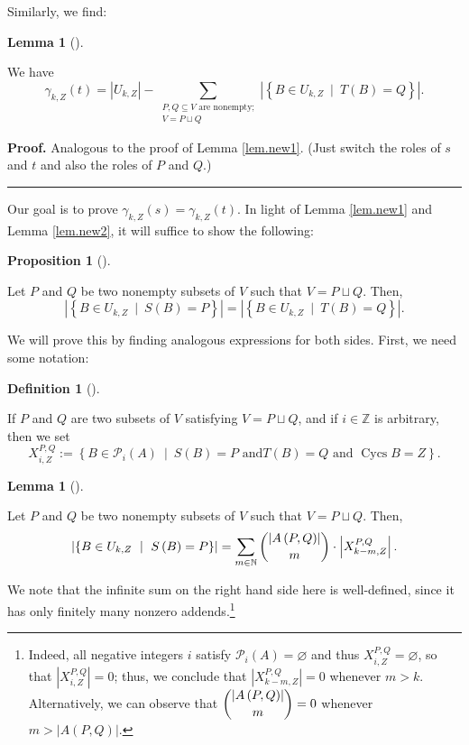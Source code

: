 \documentclass[numbers=enddot,12pt,final,onecolumn,notitlepage]{scrartcl}%
\theoremstyle{definition}
\newtheorem{lem}[theo]{Lemma}
\newenvironment{lemma}[1][]
{\begin{lem}[#1]\begin{leftbar}}
{\end{leftbar}\end{lem}}
\newtheorem{prop}[theo]{Proposition}
\newenvironment{proposition}[1][]
{\begin{prop}[#1]\begin{leftbar}}
{\end{leftbar}\end{prop}}
\newtheorem{defi}[theo]{Definition}
\newenvironment{definition}[1][]
{\begin{defi}[#1]\begin{leftbar}}
{\end{leftbar}\end{defi}}
\newenvironment{proof}[1][Proof]{\noindent\textbf{#1.} }{\ \rule{0.5em}{0.5em}}
\let\sumnonlimits\sum
\renewcommand{\sum}{\sumnonlimits\limits}
\theoremstyle{plainsl}
\begin{document}
Similarly, we find:

\begin{lemma}
\label{lem.new2}We have%
\[
\gamma_{k,Z}\left(  t\right)  =\left\vert U_{k,Z}\right\vert -\sum
_{\substack{P,Q\subseteq V\text{ are nonempty;}\\V=P\sqcup Q}}\left\vert
\left\{  B\in U_{k,Z}\ \mid\ T\left(  B\right)  =Q\right\}  \right\vert .
\]

\end{lemma}

\begin{proof}
Analogous to the proof of Lemma \ref{lem.new1}. (Just switch the roles of $s$
and $t$ and also the roles of $P$ and $Q$.)
\end{proof}

Our goal is to prove $\gamma_{k,Z}\left(  s\right)  =\gamma_{k,Z}\left(
t\right)  $. In light of Lemma \ref{lem.new1} and Lemma \ref{lem.new2}, it
will suffice to show the following:

\begin{proposition}
\label{prop.new3}Let $P$ and $Q$ be two nonempty subsets of $V$ such that
$V=P\sqcup Q$. Then,%
\[
\left\vert \left\{  B\in U_{k,Z}\ \mid\ S\left(  B\right)  =P\right\}
\right\vert =\left\vert \left\{  B\in U_{k,Z}\ \mid\ T\left(  B\right)
=Q\right\}  \right\vert .
\]

\end{proposition}

We will prove this by finding analogous expressions for both sides. First, we
need some notation:

\begin{definition}
If $P$ and $Q$ are two subsets of $V$ satisfying $V=P\sqcup Q$, and if
$i\in\mathbb{Z}$ is arbitrary, then we set%
\[
X_{i,Z}^{P,Q}:=\left\{  B\in\mathcal{P}_{i}(A)\ \mid\ S(B)=P\text{ and
}T(B)=Q\text{ and }\operatorname*{Cycs}B=Z\right\}  .
\]

\end{definition}

\begin{lemma}
\label{lem.new4}Let $P$ and $Q$ be two nonempty subsets of $V$ such that
$V=P\sqcup Q$. Then,%
\[
\left\vert \left\{  B\in U_{k,Z}\ \mid\ S\left(  B\right)  =P\right\}
\right\vert =\sum_{m\in\mathbb{N}}\dbinom{\left\vert A\left(  P,Q\right)
\right\vert }{m}\cdot\left\vert X_{k-m,Z}^{P,Q}\right\vert .
\]

\end{lemma}

We note that the infinite sum on the right hand side here is well-defined,
since it has only finitely many nonzero addends.\footnote{Indeed, all negative
integers $i$ satisfy $\mathcal{P}_{i}\left(  A\right)  =\varnothing$ and thus
$X_{i,Z}^{P,Q}=\varnothing$, so that $\left\vert X_{i,Z}^{P,Q}\right\vert =0$;
thus, we conclude that $\left\vert X_{k-m,Z}^{P,Q}\right\vert =0$ whenever
$m>k$. Alternatively, we can observe that $\dbinom{\left\vert A\left(
P,Q\right)  \right\vert }{m}=0$ whenever $m>\left\vert A\left(  P,Q\right)
\right\vert $.}
\end{document}

